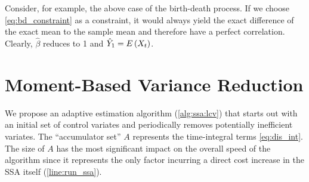 \begin{example} Consider, for example, the above case of the
  birth-death process.
  If we choose \eqref{eq:bd_constraint} as a constraint, it would always yield
  the exact difference of the exact mean to the sample mean and therefore have a
  perfect correlation. Clearly, $\hat\beta$ reduces to \num{1} and
  $\hat Y_1 = {E}\left(X_t\right)$.
\end{example}

\section{Moment-Based Variance Reduction}\label{sec:cv:algo}
We propose an adaptive estimation algorithm (\autoref{alg:ssa:lcv})
that starts out with
an initial set of control variates
and periodically removes potentially inefficient variates.
The ``accumulator set'' $A$ represents the time-integral terms
\eqref{eq:dis_int}.
The size of $A$ has the most significant impact on the overall speed
of the algorithm
since it represents the only factor incurring a direct cost increase
in the \ac{SSA} itself (\autoref{line:run_ssa}).

